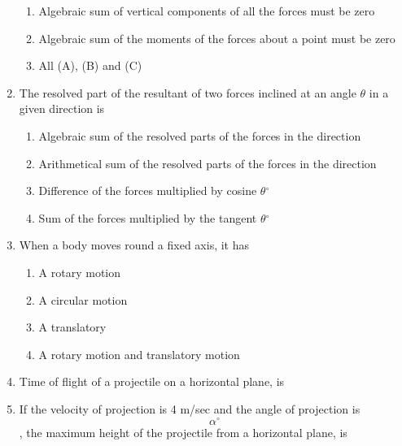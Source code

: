 \documentclass[11pt,a4paper]{article}
\begin{document}
\begin{enumerate}
\begin{enumerate}[label=\Alph*.]
\item{Algebraic sum of vertical components of all the forces must be zero}
\item{Algebraic sum of the moments of the forces about a point must be zero}
\item{All (A), (B) and (C)}
\end{enumerate}
\item{The resolved part of the resultant of two forces inclined at an angle $\theta$ in a given direction is
}
\begin{enumerate}[label=\Alph*.]
\item{Algebraic sum of the resolved parts of the forces in the direction}
\item{Arithmetical sum of the resolved parts of the forces in the direction}
\item{Difference of the forces multiplied by cosine $\theta$$^\circ$}
\item{Sum of the forces multiplied by the tangent $\theta$$^\circ$}
\end{enumerate}
\item{When a body moves round a fixed axis, it has}
\begin{enumerate}[label=\Alph*.]
\item{A rotary motion}
\item{A circular motion}
\item{A translatory}
\item{A rotary motion and translatory motion}
\end{enumerate}
\item{Time of flight of a projectile on a horizontal plane, is}
\\
\item{If the velocity of projection is 4 m/sec and the angle of projection is $${\alpha ^ \circ }$$, the maximum height of the projectile from a horizontal plane, is
}
\\\begin{enumerate*}[itemjoin=\qquad, label=\Alph*.]

\end{enumerate*}
\end{enumerate}
\end{document}
